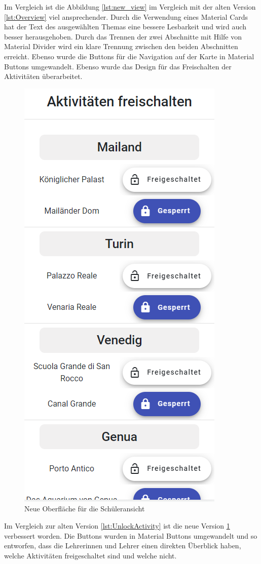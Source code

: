\newpage
Im Vergleich ist die Abbildung \ref{lst:new_view} im Vergleich mit der alten Version \ref{lst:Overview} viel ansprechender. Durch die Verwendung eines Material Cards hat der Text des ausgewählten Themas eine bessere Lesbarkeit und wird auch besser herausgehoben. Durch das Trennen der zwei Abschnitte mit Hilfe von Material Divider wird ein klare Trennung zwischen den beiden Abschnitten erreicht. Ebenso wurde die Buttons für die Navigation auf der Karte in Material Buttons umgewandelt.
\newpage
Ebenso wurde das Design für das Freischalten der Aktivitäten überarbeitet.

\begin{figure}[h]
    \centering
    \includegraphics[scale=0.85]{pics/new_unlock_activity.png}
    \caption{Neue Oberfläche für die Schüleransicht}
    \label{lst:new_unlock_activity}
\end{figure}
Im Vergleich zur alten Version \ref{lst:UnlockActivity} ist die neue Version \ref{lst:new_unlock_activity} verbessert worden. Die Buttons wurden in Material Buttons umgewandelt und so entworfen, dass die Lehrerinnen und Lehrer einen direkten Überblick haben, welche Aktivitäten freigeschaltet sind und welche nicht.
\newpage

